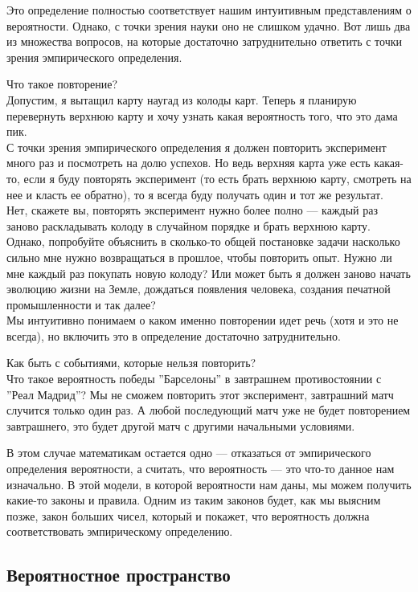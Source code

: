 \documentclass[11 pt,russian]{article}
\begin{document}
Это определение полностью соответствует нашим интуитивным представлениям о вероятности. Однако, с точки зрения науки оно не слишком удачно. Вот лишь два из множества вопросов, на которые достаточно затруднительно ответить с точки зрения эмпирического определения.
\begin{enumerate*}
\item Что такое повторение?\\
Допустим, я вытащил карту наугад из колоды карт. Теперь я планирую перевернуть верхнюю карту и хочу узнать какая вероятность того, что это дама пик.\\
С точки зрения эмпирического определения я должен повторить эксперимент много раз и посмотреть на долю успехов. Но ведь верхняя карта уже есть какая-то, если я буду повторять эксперимент (то есть брать верхнюю карту, смотреть на нее и класть ее обратно), то я всегда буду получать один и тот же результат.\\
Нет, скажете вы, повторять эксперимент нужно более полно --- каждый раз заново раскладывать колоду в случайном порядке и брать верхнюю карту.\\
Однако, попробуйте объяснить в сколько-то общей постановке задачи насколько сильно мне нужно возвращаться в прошлое, чтобы повторить опыт. Нужно ли мне каждый раз покупать новую колоду? Или может быть я должен заново начать эволюцию жизни на Земле, дождаться появления человека, создания печатной промышленности и так далее?\\
Мы интуитивно понимаем о каком именно повторении идет речь (хотя и это не всегда), но включить это в определение достаточно затруднительно. 
\item Как быть с событиями, которые нельзя повторить?\\
Что такое вероятность победы ''Барселоны'' в завтрашнем противостоянии с ''Реал Мадрид''? Мы не сможем повторить этот эксперимент, завтрашний матч случится только один раз. А любой последующий матч уже не будет повторением завтрашнего, это будет другой матч с другими начальными условиями.
\end{enumerate*}
В этом случае математикам остается одно --- отказаться от эмпирического определения вероятности, а считать, что вероятность --- это что-то данное нам изначально. В этой модели, в которой вероятности нам даны, мы можем получить какие-то законы и правила. Одним из таким законов будет, как мы выясним позже, закон больших чисел, %
который и покажет, что вероятность  должна соответствовать эмпирическому определению.
\subsection{Вероятностное пространство} 
\end{document}
